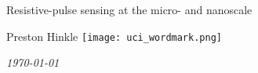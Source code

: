 





{
\begin{frame}[c]
 \begin{center}
  

  
  \Huge{
	\textcolor{gray0}{Resistive-pulse sensing at the micro- and nanoscale}
  }
  
  
  \vspace{.25in}
  {\Large 
	\textcolor{gray1}{Preston Hinkle} \hspace{.5in} \texttt{[image: uci\_wordmark.png]}
  }
  
  
  \vspace{.5in}
  {\small
	\textit{\today}
  }
  
  
  
 \end{center}

\end{frame}
}





